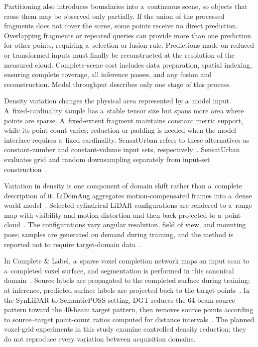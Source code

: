 Partitioning also introduces boundaries into a~continuous scene, so objects that cross them may be observed only partially. If the union of the processed fragments does not cover the scene, some points receive no direct prediction. Overlapping fragments or repeated queries can provide more than one prediction for other points, requiring a~selection or fusion rule. Predictions made on reduced or transformed inputs must finally be reconstructed at the resolution of the measured cloud. Complete-scene cost includes data preparation, spatial indexing, ensuring complete coverage, all inference passes, and any fusion and reconstruction. Model throughput describes only one stage of this process.

Density variation changes the physical area represented by a~model input. A~fixed-cardinality sample has a~stable tensor size but spans more area where points are sparse. A~fixed-extent fragment maintains constant metric support, while its point count varies; reduction or padding is needed when the model interface requires a~fixed cardinality. SensatUrban refers to these alternatives as constant-number and constant-volume input sets, respectively~\citep{sensaturban}. SensatUrban evaluates grid and random downsampling separately from input-set construction~\citep{sensaturban}.

Variation in density is one component of domain shift rather than a~complete description of it. LiDomAug aggregates motion-compensated frames into a~dense world model~\citep{lidomaug}. Selected cylindrical LiDAR configurations are rendered to a~range map with visibility and motion distortion and then back-projected to a~point cloud~\citep{lidomaug}. The configurations vary angular resolution, field of view, and mounting pose; samples are generated on demand during training, and the method is reported not to require target-domain data~\citep{lidomaug}.

In Complete \& Label, a~sparse voxel completion network maps an input scan to a~completed voxel surface, and segmentation is performed in this canonical domain~\citep{complete-label}. Source labels are propagated to the completed surface during training; at inference, predicted surface labels are projected back to the target points~\citep{complete-label}. In the SynLiDAR-to-SemanticPOSS setting, DGT reduces the 64-beam source pattern toward the 40-beam target pattern, then removes source points according to source--target point-count ratios computed for distance intervals~\citep{densityshift}. The planned voxel-grid experiments in this study examine controlled density reduction; they do not reproduce every variation between acquisition domains.

